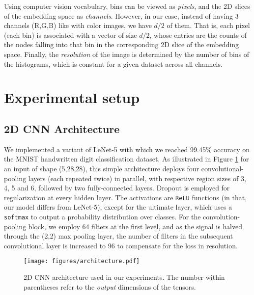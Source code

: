 \documentclass[sigconf]{acmart}
\begin{document}
Using computer vision vocabulary, bins can be viewed as \textit{pixels}, and the 2D slices of the embedding space as \textit{channels}. However, in our case, instead of having 3 channels (R,G,B) like with color images,  we have $d/2$ of them. That is, each pixel (each bin) is associated with a vector of size $d/2$, whose entries are the counts of the nodes falling into that bin in the corresponding 2D slice of the embedding space. Finally, the \textit{resolution} of the image is determined by the number of bins of the histograms, which is constant for a given dataset across all channels.

\section{Experimental setup}

\subsection{2D CNN Architecture}
We implemented a variant of LeNet-5 \citep{lecun1998gradient} with which we reached 99.45\% accuracy on the MNIST handwritten digit classification dataset. As illustrated in Figure \ref{fig:arch} for an input of shape (5,28,28), this simple architecture deploys four convolutional-pooling layers (each repeated twice) in parallel, with respective region sizes of 3, 4, 5 and 6, followed by two fully-connected layers. Dropout \citep{srivastava2014dropout} is employed for regularization at every hidden layer. The activations are \texttt{ReLU} functions (in that, our model differs from LeNet-5), except for the ultimate layer, which uses a \texttt{softmax} to output a probability distribution over classes. For the convolution-pooling block, we employ 64 filters at the first level, and as the signal is halved through the (2,2) max pooling layer, the number of filters in the subsequent convolutional layer is increased to 96 to compensate for the loss in resolution.

\begin{figure}[h]
  \centering
    \texttt{[image: figures/architecture.pdf]}
\captionsetup{justification=justified,singlelinecheck=false, size=small}
    \caption{2D CNN architecture used in our experiments. The number within parentheses refer to the \textit{output} dimensions of the tensors. }
\label{fig:arch}
\end{figure}

\end{document}
